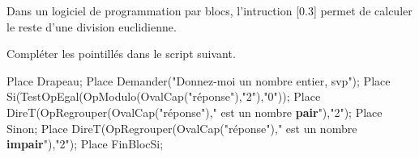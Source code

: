     Dans un logiciel de programmation par blocs, l'intruction
    \raisebox{-0.3\totalheight}[0.3\totalheight]{\raisebox{\depth}{
    \begin{Scratch}[Echelle=0.75]
        Place OpModulo(" "," ");
    \end{Scratch}
    }}
    permet de calculer le reste d'une division euclidienne.

    Compléter les pointillés dans le script suivant.

    \begin{Scratch}[Echelle=0.75]
        Place Drapeau;
        Place Demander("Donnez-moi un nombre entier, svp");
        Place Si(TestOpEgal(OpModulo(OvalCap("réponse"),"2"),"0"));
        Place DireT(OpRegrouper(OvalCap("réponse")," est un nombre \textbf{pair}"),"2");
        Place Sinon;
        Place DireT(OpRegrouper(OvalCap("réponse")," est un nombre \textbf{impair}"),"2");
        Place FinBlocSi;
    \end{Scratch}
